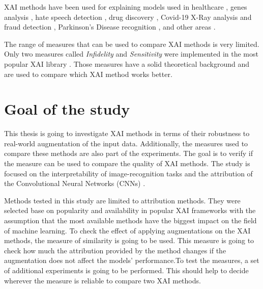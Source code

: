 \vspace{\baselineskip}

XAI methods have been used for explaining models used in healthcare \cite{rethmeier2020efficare, sidhom2021deep, kleppe2021designing, xiao2021screening, van2020systematic, mamandipoor2021machine, lind2021artificial}, genes analysis \cite{liu2021interrogation}, hate speech detection \cite{kovacs2021challenges}, drug discovery \cite{jimenez2021artificial}, Covid-19 X-Ray analysis \cite{panwar2020deep, ahmed2021discovery} and fraud detection \cite{sinanc2021explainable}, Parkinson’s Disease recognition \cite{pianpanit2021parkinson}, and other areas \cite{kovacs2021challenges, asif2020deepselex}.

\vspace{\baselineskip}

The range of measures that can be used to compare XAI methods is very limited. Only two measures called \textit{Infidelity} and \textit{Sensitivity}\cite{yeh2019fidelity} were implemented in the most popular XAI library \cite{kokhlikyan2020captum}. Those measures have a solid theoretical background and are used to compare which XAI method works better. 

\section{Goal of the study}

This thesis is going to investigate XAI methods in terms of their robustness to real-world augmentation of the input data. Additionally, the measures used to compare these methods are also part of the experiments. The goal is to verify if the measure can be used to compare the quality of XAI methods. The study is focused on the interpretability of image-recognition tasks and the attribution of the Convolutional Neural Networks (CNNs) \cite{lecun1995convolutional, lecun1989backpropagation}.

\vspace{\baselineskip}

Methods tested in this study are limited to attribution methods. They were selected base on popularity and availability in popular XAI frameworks with the assumption that the most available methods have the biggest impact on the field of machine learning. To check the effect of applying augmentations on the XAI methods, the measure of similarity is going to be used. This measure is going to check how much the attribution provided by the method changes if the augmentation does not affect the models' performance.To test the measures, a set of additional experiments is going to be performed. This should help to decide wherever the measure is reliable to compare two XAI methods.

